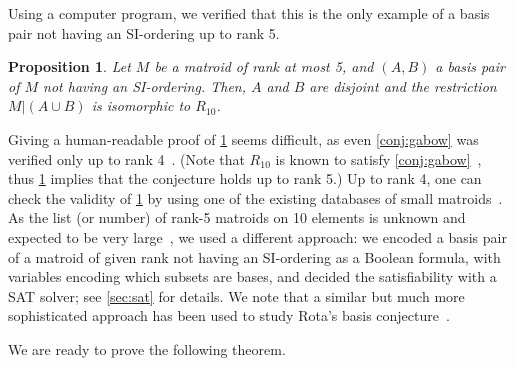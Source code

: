 \documentclass{article}
\newtheorem{proposition}[theorem]{Proposition}
\theoremstyle{definition}
\begin{document}
Using a computer program, we verified that this is the only example of a basis pair not having an SI-ordering up to rank 5.

\begin{proposition} \label{prop:sat}
Let $M$ be a matroid of rank at most 5, and $(A,B)$ a basis pair of $M$ not having an SI-ordering.
Then, $A$ and $B$ are disjoint and the restriction $M|(A\cup B)$ is isomorphic to $R_{10}$.
\end{proposition}

Giving a human-readable proof of \cref{prop:sat} seems difficult, as even \cref{conj:gabow} was verified only up to rank 4~\cite{kotlar2013serial}. (Note that $R_{10}$ is known to satisfy \cref{conj:gabow}~\cite{berczi2023reconfiguration}, thus \cref{prop:sat} implies that the conjecture holds up to rank 5.)
Up to rank 4, one can check the validity of \cref{prop:sat} by using one of the existing databases of small matroids~\cite{mayhew2008nine}. 
As the list (or number) of rank-5 matroids on 10 elements is unknown and expected to be very large~\cite{mayhew2008nine}, we used a different approach: we encoded a basis pair of a matroid of given rank not having an SI-ordering as a Boolean formula, with variables encoding which subsets are bases, and decided the satisfiability with a SAT solver; see \cref{sec:sat} for details. We note that a similar but much more sophisticated approach has been used to study Rota's basis conjecture~\cite{kirchweger2022sat}.

We are ready to prove the following theorem.
\end{document}

